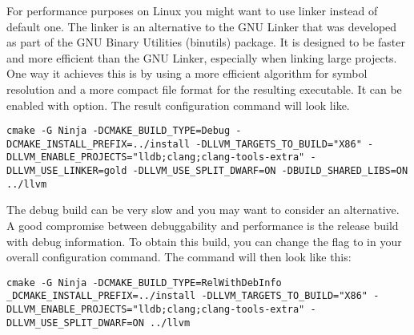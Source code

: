 For performance purposes on Linux you might want to use  linker
instead of default one. The  linker is an alternative to
the GNU Linker that was developed as part of the GNU Binary Utilities (binutils)
package. It is designed to be faster and more efficient than the GNU Linker,
especially when linking large projects. One way it achieves this is by using a
more efficient algorithm for symbol resolution and a more compact file format
for the resulting executable. It can be enabled with
 option. The result configuration command will
look like. 
\begin{verbatim}
cmake -G Ninja -DCMAKE_BUILD_TYPE=Debug -DCMAKE_INSTALL_PREFIX=../install -DLLVM_TARGETS_TO_BUILD="X86" -DLLVM_ENABLE_PROJECTS="lldb;clang;clang-tools-extra" -DLLVM_USE_LINKER=gold -DLLVM_USE_SPLIT_DWARF=ON -DBUILD_SHARED_LIBS=ON ../llvm
\end{verbatim}

The debug build can be very slow and you may want to consider an alternative. A
good compromise between debuggability and performance is the release build with
debug information. To obtain this build, you can change the
 flag to  in your overall configuration command. The command will
then look like this: 
\begin{verbatim}
cmake -G Ninja -DCMAKE_BUILD_TYPE=RelWithDebInfo _DCMAKE_INSTALL_PREFIX=../install -DLLVM_TARGETS_TO_BUILD="X86" -DLLVM_ENABLE_PROJECTS="lldb;clang;clang-tools-extra" -DLLVM_USE_SPLIT_DWARF=ON ../llvm
\end{verbatim}

